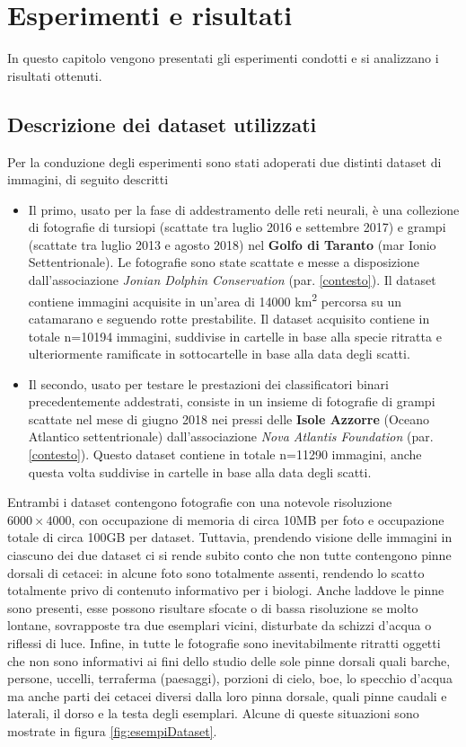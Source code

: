 \chapter{Esperimenti e risultati}\label{esperimenti}
In questo capitolo vengono presentati gli esperimenti condotti e si analizzano i risultati ottenuti.

\section{Descrizione dei dataset utilizzati}
\label{dataset}
Per la conduzione degli esperimenti sono stati adoperati due distinti dataset di immagini, di seguito descritti

\begin{itemize}

\item Il primo, usato per la fase di addestramento delle reti neurali, è una collezione di fotografie di tursiopi (scattate tra luglio 2016 e settembre 2017) e grampi (scattate tra luglio 2013 e agosto 2018) nel \textbf{Golfo di Taranto} (mar Ionio Settentrionale). Le fotografie sono state scattate e messe a disposizione dall'associazione \textit{Jonian Dolphin Conservation} (par. \ref{contesto}). Il dataset contiene immagini acquisite in un'area di 14000 km\textsuperscript{2} percorsa su un catamarano e seguendo rotte prestabilite.
Il dataset acquisito contiene in totale n=10194 immagini, suddivise in cartelle in base alla specie ritratta e ulteriormente ramificate in sottocartelle in base alla data degli scatti.

\item Il secondo, usato per testare le prestazioni dei classificatori binari precedentemente addestrati, consiste in un insieme di fotografie di grampi scattate nel mese di giugno 2018 nei pressi delle \textbf{Isole Azzorre} (Oceano Atlantico settentrionale) dall'associazione \textit{Nova Atlantis Foundation} (par. \ref{contesto}).
Questo dataset contiene in totale n=11290 immagini, anche questa volta suddivise in cartelle in base alla data degli scatti.
\end{itemize}

Entrambi i dataset contengono fotografie con una notevole risoluzione $6000\times 4000$, con occupazione di memoria di circa 10MB per foto e occupazione totale di circa 100GB per dataset. Tuttavia, prendendo visione delle immagini in ciascuno dei due dataset ci si rende subito conto che non tutte contengono pinne dorsali di cetacei: in alcune foto sono totalmente assenti, rendendo lo scatto totalmente privo di contenuto informativo per i biologi.
Anche laddove le pinne sono presenti, esse possono risultare sfocate o di bassa risoluzione se molto lontane, sovrapposte tra due esemplari vicini, disturbate da schizzi d'acqua o riflessi di luce. Infine, in tutte le fotografie sono inevitabilmente ritratti oggetti che non sono informativi ai fini dello studio delle sole pinne dorsali quali barche, persone, uccelli, terraferma (paesaggi), porzioni di cielo, boe, lo specchio d'acqua ma anche parti dei cetacei diversi dalla loro pinna dorsale, quali pinne caudali e laterali, il dorso e la testa degli esemplari. Alcune di queste situazioni sono mostrate in figura \ref{fig:esempiDataset}.

